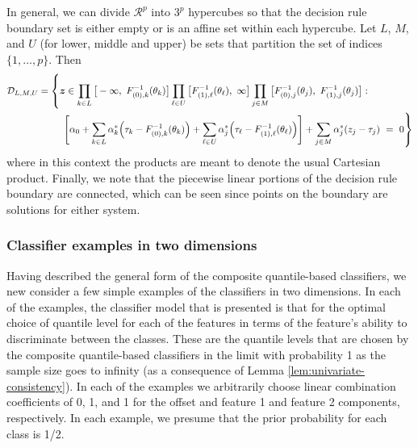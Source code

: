 In general, we can divide $\mathcal{R}^p$ into $3^p$ hypercubes so that the
decision rule boundary set is either empty or is an affine set within each
hypercube.  Let $L$, $M$, and $U$ (for lower, middle and upper) be sets that
partition the set of indices $\{1, \dots, p\}$.  Then
\begin{equation}
  \label{eq:composite-classifiers-general}
  \begin{split}
    \mathcal{D}_{L,M,U} = \left\{
      \vec{z} \in
      \prod_{k \in L} \big[ -\infty,~ F_{(0),k}^{-1}(\theta_k) \big]
      \prod_{\ell \in U} \big[ F_{(1),\ell}^{-1}(\theta_{\ell}),~ \infty \big]
      \prod_{j \in M} \big[ F_{(0),j}^{-1}(\theta_j),~ F_{(1),j}^{-1}(\theta_j) \big] :
      \phantom{\hspace{15mm}}
    \right.  \\
    \left.
      \left[
        \alpha_0 + 
        \sum_{k \in L} \alpha_k^{*} \Big(\tau_k - F_{(0),k}^{-1}(\theta_k)\Big) +
        \sum_{\ell \in U} \alpha_j^{*} \Big(\tau_{\ell} - F_{(1),\ell}^{-1}(\theta_{\ell})\Big)
      \right] +
        \sum_{j \in M} \alpha_j^{*} (z_j - \tau_j) ~=~ 0
    \right\}
  \end{split}
\end{equation}
where in this context the products are meant to denote the usual Cartesian
product.  Finally, we note that the piecewise linear portions of the decision
rule boundary are connected, which can be seen since points on the boundary are
solutions for either system.


\subsubsection{Classifier examples in two dimensions}
\label{sec:classifier-examples}

Having described the general form of the composite quantile-based classifiers,
we new consider a few simple examples of the classifiers in two dimensions.  In
each of the examples, the classifier model that is presented is that for the
optimal choice of quantile level for each of the features in terms of the
feature's ability to discriminate between the classes.  These are the quantile
levels that are chosen by the composite quantile-based classifiers in the limit
with probability 1 as the sample size goes to infinity (as a consequence of
Lemma \ref{lem:univariate-consistency}).  In each of the examples we arbitrarily
choose linear combination coefficients of 0, 1, and 1 for the offset and feature
1 and feature 2 components, respectively.  In each example, we presume that the
prior probability for each class is 1/2.

